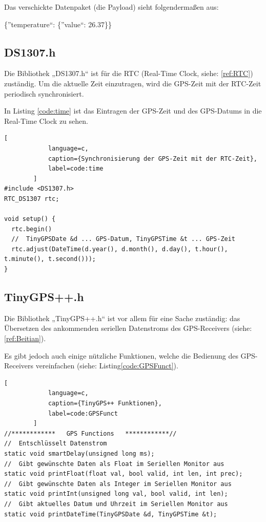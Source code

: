         Das verschickte Datenpaket (die Payload) sieht folgendermaßen aus:
        \begin{center}
            \{''temperature``: \{''value``: 26.37\}\}
        \end{center}
    
    \subsection{DS1307.h}
    
        Die Bibliothek „DS1307.h“ ist für die RTC (Real-Time Clock, siehe: \ref{ref:RTC}) zuständig. Um die aktuelle Zeit einzutragen, wird die GPS-Zeit mit der RTC-Zeit periodisch synchronisiert. 
        
        In Listing \ref{code:time} ist das Eintragen der GPS-Zeit und des GPS-Datums in die Real-Time Clock zu sehen.  
        
        \begin{lstlisting}[
            language=c,
            caption={Synchronisierung der GPS-Zeit mit der RTC-Zeit},
            label=code:time
        ]
#include <DS1307.h>
RTC_DS1307 rtc;

void setup() {
  rtc.begin()
  //  TinyGPSDate &d ... GPS-Datum, TinyGPSTime &t ... GPS-Zeit
  rtc.adjust(DateTime(d.year(), d.month(), d.day(), t.hour(), t.minute(), t.second()));  
}
        \end{lstlisting}
        
    \subsection{TinyGPS++.h}
    
    Die Bibliothek „TinyGPS++.h“ ist vor allem für eine Sache zuständig: das Übersetzen des ankommenden seriellen Datenstroms des GPS-Receivers (siehe: \ref{ref:Beitian}).
    
    Es gibt jedoch auch einige nützliche Funktionen, welche die Bedienung des GPS-Receivers vereinfachen (siehe: Listing\ref{code:GPSFunct}). 
    
            \begin{lstlisting}[
            language=c,
            caption={TinyGPS++ Funktionen},
            label=code:GPSFunct
        ]
//************   GPS Functions   ************//
//  Entschlüsselt Datenstrom
static void smartDelay(unsigned long ms);
//  Gibt gewünschte Daten als Float im Seriellen Monitor aus 
static void printFloat(float val, bool valid, int len, int prec);
//  Gibt gewünschte Daten als Integer im Seriellen Monitor aus 
static void printInt(unsigned long val, bool valid, int len);
//  Gibt aktuelles Datum und Uhrzeit im Seriellen Monitor aus
static void printDateTime(TinyGPSDate &d, TinyGPSTime &t);
        \end{lstlisting}
        
